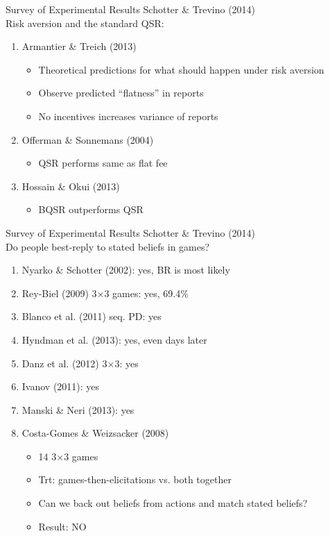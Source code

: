 \begin{frame}{Survey of Experimental Results}
    Schotter \& Trevino (2014)\\
    Risk aversion and the standard QSR:
    \begin{enumerate}
        \item Armantier \& Treich (2013)
        \begin{itemize}
            \item Theoretical predictions for what should happen under risk aversion
            \item Observe predicted ``flatness'' in reports
            \item No incentives increases variance of reports
        \end{itemize}
        \item Offerman \& Sonnemans (2004)
        \begin{itemize}
            \item QSR performs same as flat fee
        \end{itemize}
        \item Hossain \& Okui (2013)
        \begin{itemize}
            \item BQSR outperforms QSR
        \end{itemize}
    \end{enumerate}
\end{frame}


\begin{frame}{Survey of Experimental Results}
    Schotter \& Trevino (2014)\\
    Do people best-reply to stated beliefs in games?
    \begin{enumerate}
        \item Nyarko \& Schotter (2002): yes, BR is most likely
        \item Rey-Biel (2009) 3$\times$3 games: yes, 69.4\%
        \item Blanco et al. (2011) seq. PD: yes
        \item Hyndman et al. (2013): yes, even days later
        \item Danz et al. (2012) 3$\times$3: yes
        \item Ivanov (2011): yes
        \item Manski \& Neri (2013): yes
        \item Costa-Gomes \& Weizsacker (2008)
        \begin{itemize}
            \item 14 3$\times$3 games
            \item Trt: games-then-elicitations vs. both together
            \item Can we back out beliefs from actions and match stated beliefs?
            \item Result: NO
        \end{itemize}
    \end{enumerate}
\end{frame}


